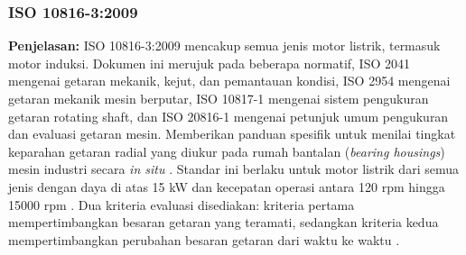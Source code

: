 \documentclass{elsinta}
\begin{document}





\subsubsection{ISO 10816-3:2009}
\textbf{Penjelasan:} ISO 10816-3:2009 mencakup  semua jenis motor listrik, termasuk motor induksi. Dokumen ini merujuk pada beberapa normatif, ISO 2041 mengenai getaran mekanik, kejut, dan pemantauan kondisi, ISO 2954 mengenai getaran mekanik mesin berputar, ISO 10817-1 mengenai sistem pengukuran getaran rotating shaft, dan ISO 20816-1 mengenai petunjuk umum pengukuran dan evaluasi getaran mesin.
Memberikan panduan spesifik untuk menilai tingkat keparahan getaran radial yang diukur pada rumah bantalan (\textit{bearing housings}) mesin industri secara \textit{in situ} \cite{iso10816_2009}. Standar ini berlaku untuk motor listrik dari semua jenis dengan daya di atas 15 kW dan kecepatan operasi antara 120 rpm hingga 15000 rpm \cite{iso10816_2009_bsi}. Dua kriteria evaluasi disediakan: kriteria pertama mempertimbangkan besaran getaran yang teramati, sedangkan kriteria kedua mempertimbangkan perubahan besaran getaran dari waktu ke waktu \cite{iso10816_2009}.
\end{document}
